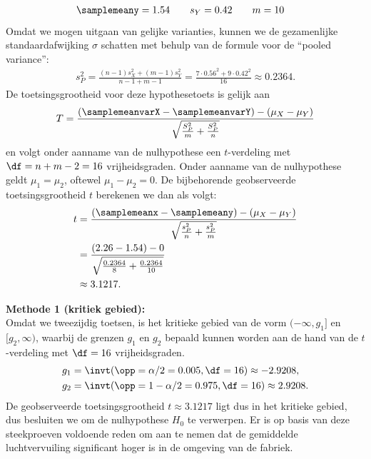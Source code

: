 {\begin{align*}
        \samplemeany &= 1.54 \qquad s_Y = 0.42 \qquad m = 10
    \end{align*}
    Omdat we mogen uitgaan van gelijke varianties, kunnen we de gezamenlijke standaardafwijking $\sigma$ schatten met behulp van de formule voor de \enquote{pooled variance}:
    \begin{align*}
        s_P^2 = \frac{(n-1)s_X^2+(m-1)s_Y^2}{n-1+m-1} = \frac{7\cdot 0.56^2 + 9 \cdot 0.42^2}{16} \approx 0.2364.
    \end{align*}
    De toetsingsgrootheid voor deze hypothesetoets is gelijk aan
    \[
        T = \frac{(\samplemeanvarX - \samplemeanvarY) - (\mu_X - \mu_Y)}{\sqrt{\frac{S_P^2}{m}+\frac{S_P^2}{n}}}
    \]
    en volgt onder aanname van de nulhypothese een $t$-verdeling met $\df = n + m - 2 = 16$ vrijheidsgraden.
    Onder aanname van de nulhypothese geldt $\mu_1 = \mu_2$, oftewel $\mu_1 - \mu_2 = 0$.
    De bijbehorende geobserveerde toetsingsgrootheid $t$ berekenen we dan als volgt:
    \begin{align*}
        t   &= \frac{(\samplemeanx - \samplemeany) - (\mu_X - \mu_Y)}{\sqrt{\frac{s_P^2}{n} + \frac{s_P^2}{m}}} \\
            &= \frac{(2.26 - 1.54) - 0}{\sqrt{\frac{0.2364}{8} + \frac{0.2364}{10}}} \\
            &\approx 3.1217.
    \end{align*}

    {\noindent\bfseries Methode 1 (kritiek gebied):}\\    
    Omdat we tweezijdig toetsen, is het kritieke gebied van de vorm $(-\infty, g_1]$ en $[g_2, \infty)$, waarbij de grenzen $g_1$ en $g_2$ bepaald kunnen worden 
    aan de hand van de $t$-verdeling met $\df=16$ vrijheidsgraden.
    \begin{align*}
        g_1 &= \invt(\opp=\alpha/2=0.005, \df=16) \approx -2.9208, \\
        g_2 &= \invt(\opp=1-\alpha/2=0.975, \df=16) \approx 2.9208.
    \end{align*}
    De geobserveerde toetsingsgrootheid $t \approx 3.1217$ ligt dus in het kritieke gebied, dus besluiten we om de nulhypothese $H_0$ te verwerpen.
    Er is op basis van deze steekproeven voldoende reden om aan te nemen dat de gemiddelde luchtvervuiling significant hoger is in de omgeving van de fabriek.\\
    \medskip

}
